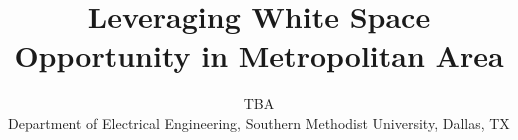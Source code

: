 \documentclass[10pt,conference]{IEEEtran}
\begin{document}
\title{Leveraging White Space Opportunity in Metropolitan Area}
\author{ TBA\\ 
Department of Electrical Engineering, Southern Methodist University, Dallas, TX \\
}





\maketitle












\end{document}
